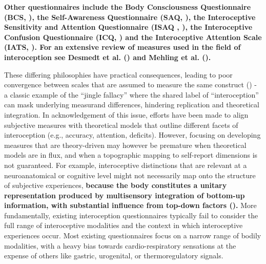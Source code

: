 \documentclass[
  man,
  floatsintext,
  longtable,
  nolmodern,
  notxfonts,
  notimes,
  mask,
  colorlinks=true,linkcolor=blue,citecolor=blue,urlcolor=blue]{apa7}
\begin{document}
\textbf{Other questionnaires include the Body Consciousness
Questionnaire (BCS, ), the Self-Awareness Questionnaire (SAQ,
), the
Interoceptive Sensitivity and Attention Questionnaire (ISAQ ,
), the
Interoceptive Confusion Questionnaire (ICQ,
) and the Interoceptive
Attention Scale (IATS, ). For an extensive review of measures used in the field of
interoception see Desmedt et al.
() and Mehling et al.
().}

These differing philosophies have practical consequences, leading to
poor convergence between scales that are assumed to measure the same
construct () - a
classic example of the ``jingle fallacy'' where the shared label of
``interoception'' can mask underlying measurand differences, hindering
replication and theoretical integration. In acknowledgement of this
issue, efforts have been made to align subjective measures with
theoretical models that outline different facets of interoception (e.g.,
accuracy, attention, deficits). However, focusing on developing measures
that are theory-driven may however be premature when theoretical models
are in flux, and when a topographic mapping to self-report dimensions is
not guaranteed. For example, interoceptive distinctions that are
relevant at a neuroanatomical or cognitive level might not necessarily
map onto the structure of subjective experiences, \textbf{because the
body constitutes a unitary representation produced by multisensory
integration of bottom-up information, with substantial influence from
top-down factors ().} More fundamentally, existing interoception questionnaires
typically fail to consider the full range of interoceptive modalities
and the context in which interoceptive experiences occur. Most existing
questionnaires focus on a narrow range of bodily modalities, with a
heavy bias towards cardio-respiratory sensations at the expense of
others like gastric, urogenital, or thermoregulatory signals.
\end{document}
